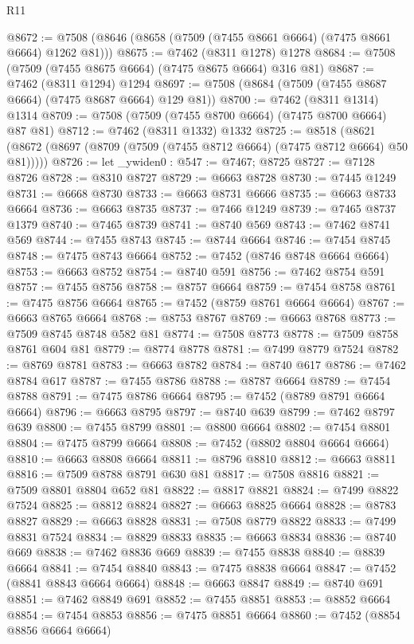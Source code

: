 \begin{lexlean}{R11}
\begin{coremodule}
@8672 := @7508 (@8646 (@8658 (@7509 (@7455 @8661 @6664) (@7475 @8661 @6664) @1262 @81)))
@8675 := @7462 (@8311 @1278) @1278
@8684 := @7508 (@7509 (@7455 @8675 @6664) (@7475 @8675 @6664) @316 @81)
@8687 := @7462 (@8311 @1294) @1294
@8697 := @7508 (@8684 (@7509 (@7455 @8687 @6664) (@7475 @8687 @6664) @129 @81))
@8700 := @7462 (@8311 @1314) @1314
@8709 := @7508 (@7509 (@7455 @8700 @6664) (@7475 @8700 @6664) @87 @81)
@8712 := @7462 (@8311 @1332) @1332
@8725 := @8518
    (@8621 (@8672 (@8697 (@8709 (@7509 (@7455 @8712 @6664) (@7475 @8712 @6664) @50 @81)))))
@8726 := let _ywiden0 : @547 := @7467; @8725
@8727 := @7128 @8726
@8728 := @8310 @8727
@8729 := @6663 @8728
@8730 := @7445 @1249
@8731 := @6668 @8730
@8733 := @6663 @8731 @6666
@8735 := @6663 @8733 @6664
@8736 := @6663 @8735
@8737 := @7466 @1249
@8739 := @7465 @8737 @1379
@8740 := @7465 @8739
@8741 := @8740 @569
@8743 := @7462 @8741 @569
@8744 := @7455 @8743
@8745 := @8744 @6664
@8746 := @7454 @8745
@8748 := @7475 @8743 @6664
@8752 := @7452 (@8746 @8748 @6664 @6664)
@8753 := @6663 @8752
@8754 := @8740 @591
@8756 := @7462 @8754 @591
@8757 := @7455 @8756
@8758 := @8757 @6664
@8759 := @7454 @8758
@8761 := @7475 @8756 @6664
@8765 := @7452 (@8759 @8761 @6664 @6664)
@8767 := @6663 @8765 @6664
@8768 := @8753 @8767
@8769 := @6663 @8768
@8773 := @7509 @8745 @8748 @582 @81
@8774 := @7508 @8773
@8778 := @7509 @8758 @8761 @604 @81
@8779 := @8774 @8778
@8781 := @7499 @8779 @7524
@8782 := @8769 @8781
@8783 := @6663 @8782
@8784 := @8740 @617
@8786 := @7462 @8784 @617
@8787 := @7455 @8786
@8788 := @8787 @6664
@8789 := @7454 @8788
@8791 := @7475 @8786 @6664
@8795 := @7452 (@8789 @8791 @6664 @6664)
@8796 := @6663 @8795
@8797 := @8740 @639
@8799 := @7462 @8797 @639
@8800 := @7455 @8799
@8801 := @8800 @6664
@8802 := @7454 @8801
@8804 := @7475 @8799 @6664
@8808 := @7452 (@8802 @8804 @6664 @6664)
@8810 := @6663 @8808 @6664
@8811 := @8796 @8810
@8812 := @6663 @8811
@8816 := @7509 @8788 @8791 @630 @81
@8817 := @7508 @8816
@8821 := @7509 @8801 @8804 @652 @81
@8822 := @8817 @8821
@8824 := @7499 @8822 @7524
@8825 := @8812 @8824
@8827 := @6663 @8825 @6664
@8828 := @8783 @8827
@8829 := @6663 @8828
@8831 := @7508 @8779 @8822
@8833 := @7499 @8831 @7524
@8834 := @8829 @8833
@8835 := @6663 @8834
@8836 := @8740 @669
@8838 := @7462 @8836 @669
@8839 := @7455 @8838
@8840 := @8839 @6664
@8841 := @7454 @8840
@8843 := @7475 @8838 @6664
@8847 := @7452 (@8841 @8843 @6664 @6664)
@8848 := @6663 @8847
@8849 := @8740 @691
@8851 := @7462 @8849 @691
@8852 := @7455 @8851
@8853 := @8852 @6664
@8854 := @7454 @8853
@8856 := @7475 @8851 @6664
@8860 := @7452 (@8854 @8856 @6664 @6664)

\end{coremodule}
\end{lexlean}
